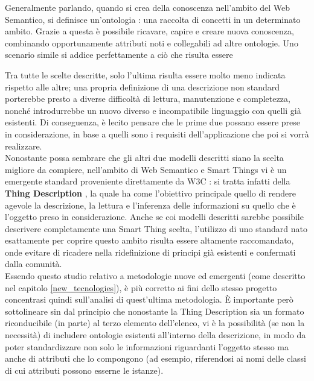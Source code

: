 \documentclass[12pt,a4paper,openright,oneside]{report}
\begin{document}
Generalmente parlando, quando si crea della conoscenza nell'ambito del Web Semantico, si definisce un'ontologia \cite{ontology}: una raccolta di concetti in un determinato ambito. Grazie a questa è possibile ricavare, capire e creare nuova conoscenza, combinando opportunamente attributi noti e collegabili ad altre ontologie. Uno scenario simile si addice perfettamente a ciò che risulta essere 

Tra tutte le scelte descritte, solo l'ultima risulta essere molto meno indicata rispetto alle altre; una propria definizione di una descrizione non standard porterebbe presto a diverse difficoltà di lettura, manutenzione e completezza, nonché introdurrebbe un nuovo diverso e incompatibile linguaggio con quelli già esistenti. Di conseguenza, è lecito pensare che le prime due possano essere prese in considerazione, in base a quelli sono i requisiti dell'applicazione che poi si vorrà realizzare.\\

Nonostante possa sembrare che gli altri due modelli descritti siano la scelta migliore da compiere, nell'ambito di Web Semantico e Smart Things vi è un emergente standard proveniente direttamente da W3C \cite{w3c}: si tratta infatti della \textbf{Thing Description} \cite{td}, la quale ha come l'obiettivo principale quello di rendere agevole la descrizione, la lettura e l'inferenza delle informazioni su quello che è l'oggetto preso in considerazione. Anche se coi modelli descritti sarebbe possibile descrivere completamente una Smart Thing scelta, l'utilizzo di uno standard nato esattamente per coprire questo ambito risulta essere altamente raccomandato, onde evitare di ricadere nella ridefinizione di principi già esistenti e confermati dalla comunità.\\

Essendo questo studio relativo a metodologie nuove ed emergenti (come descritto nel capitolo \ref{new_tecnologies}), è più corretto ai fini dello stesso progetto concentrasi quindi sull'analisi di quest'ultima metodologia. È importante però sottolineare sin dal principio che nonostante la Thing Description sia un formato riconducibile (in parte) al terzo elemento dell'elenco, vi è la possibilità (se non la necessità) di includere ontologie esistenti all'interno della descrizione, in modo da poter standardizzare non solo le informazioni riguardanti l'oggetto stesso ma anche di attributi che lo compongono (ad esempio, riferendosi ai nomi delle classi di cui attributi possono esserne le istanze).
\end{document}
